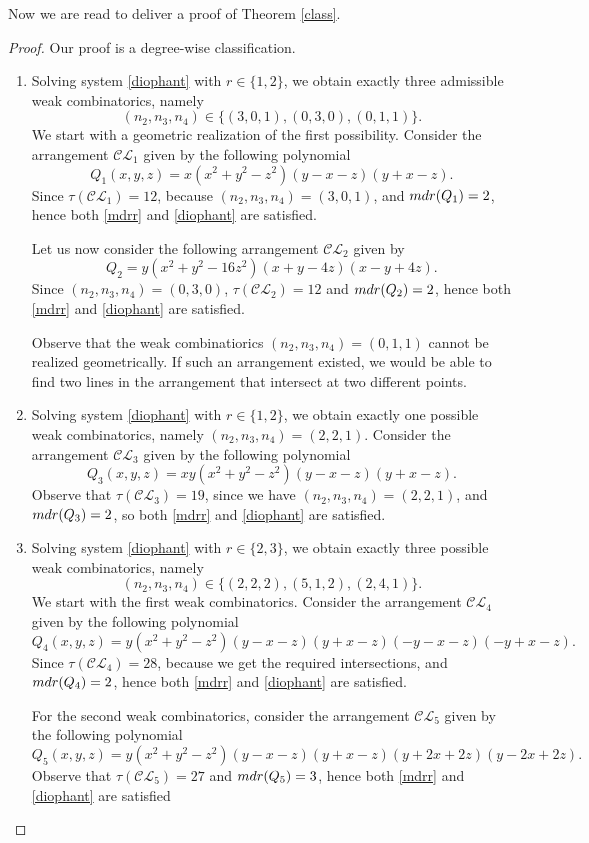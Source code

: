 \documentclass[12pt]{article}
\theoremstyle{plain}
\theoremstyle{definition}
\begin{document}
Now we are read to deliver a proof of Theorem \ref{class}.
\begin{proof}
Our proof is a degree-wise classification.
\begin{enumerate}
    \item[($d=3$):] Solving system \eqref{diophant} with $r \in \{1,2\}$, we obtain exactly three admissible weak combinatorics, namely
    $$(n_{2},n_{3},n_{4}) \in \{(3,0,1), (0,3,0), (0,1,1)\}.$$
    We start with a geometric realization of the first possibility. 
    Consider the arrangement $\mathcal{CL}_{1}$ given by the following polynomial
    $$Q_{1}(x,y,z) = x(x^2 + y^2 - z^2)(y-x-z)(y+x-z).$$ Since $\tau(\mathcal{CL}_{1})=12$, because $(n_{2},n_{3},n_{4}) = (3,0,1)$, and ${\rm mdr}(Q_{1}) = 2$, hence both \eqref{mdrr} and \eqref{diophant} are satisfied.

    Let us now consider the following arrangement $\mathcal{CL}_{2}$ given by
    $$Q_{2} = y(x^2 + y^2 -16z^2 )(x+y-4z)(x-y+4z).$$ Since $(n_{2},n_{3},n_{4}) = (0,3,0)$, $\tau(\mathcal{CL}_{2})=12$ and ${\rm mdr}(Q_{2}) = 2$, hence both \eqref{mdrr} and \eqref{diophant} are satisfied.

    Observe that the weak combinatiorics $(n_{2},n_{3},n_{4})=(0,1,1)$ cannot be realized geometrically. If such an arrangement existed, we would be able to find two lines in the arrangement that intersect at two different points.
    \item[($d=4$):] 
    Solving system \eqref{diophant} with $r \in \{1,2\}$, we obtain exactly one possible weak combinatorics, namely $(n_{2},n_{3},n_{4}) = (2,2,1)$. 
    Consider the arrangement $\mathcal{CL}_{3}$ given by the following polynomial
    $$Q_{3}(x,y,z) = xy(x^2 + y^2 - z^2)(y-x-z)(y+x-z).$$ Observe that $\tau(\mathcal{CL}_{3})=19$, since we have $(n_{2},n_{3},n_{4}) = (2,2,1)$, and ${\rm mdr}(Q_{3}) = 2$, so both \eqref{mdrr} and \eqref{diophant} are satisfied.
    \item[($d=5$):] Solving system \eqref{diophant} with $r \in \{2,3\}$, we obtain exactly three possible weak combinatorics, namely 
    $$(n_{2},n_{3},n_{4}) \in \{(2,2,2),(5,1,2),(2,4,1)\}.$$ 
    We start with the first weak combinatorics.  Consider the arrangement $\mathcal{CL}_{4}$ given by the following polynomial
    $$Q_{4}(x,y,z) = y(x^2 + y^2 - z^2)(y-x-z)(y+x-z)(-y-x-z)(-y+x-z).$$ Since $\tau(\mathcal{CL}_{4})=28$, because we get the required intersections, and ${\rm mdr}(Q_{4}) = 2$, hence both \eqref{mdrr} and \eqref{diophant} are satisfied.
    
    For the second weak combinatorics, consider the arrangement $\mathcal{CL}_{5}$ given by the following polynomial
    $$Q_{5}(x,y,z) = y(x^2 + y^2 - z^2)(y-x-z)(y+x-z)(y+2x+2z)(y-2x+2z).$$ 
    Observe that $\tau(\mathcal{CL}_{5})=27$ and ${\rm mdr}(Q_{5}) = 3$, hence both \eqref{mdrr} and \eqref{diophant} are satisfied
    

\end{enumerate}
\end{proof}
\end{document}
